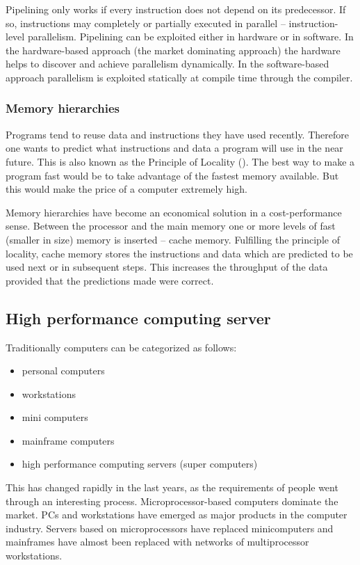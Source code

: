 Pipelining only works if every instruction does not depend on its
predecessor. If so, instructions may completely or partially executed
in parallel -- instruction-level parallelism.
Pipelining can be
exploited either in hardware or in software. In the hardware-based
approach (the market dominating approach) the hardware helps to
discover and achieve parallelism dynamically. In the software-based
approach parallelism is exploited statically at compile time through the
compiler. 

\subsubsection{Memory hierarchies}

Programs tend to reuse data and instructions they have used
recently. Therefore one wants to predict what instructions and data a
program will use in the near future. This is also known as the
Principle of Locality (\cite{C1quant07}). The best way to
make a program fast would be to take advantage of the fastest memory
available. But this would make the price of a computer extremely
high.

Memory hierarchies have become an economical solution in a
cost-performance sense. Between the processor and the main memory one
or more levels of fast (smaller in size) memory is inserted -- cache
memory. Fulfilling the principle of locality, cache memory stores the
instructions and data which are predicted to be used next or in
subsequent steps. This increases the throughput of the data provided that
the predictions made were correct.

\subsection{High performance computing server}

Traditionally computers can be categorized as follows:
\begin{itemize}
\item personal computers
\item workstations
\item mini computers
\item mainframe computers
\item high performance computing servers (super computers)
\end{itemize}

This has changed rapidly in the last years, as the requirements of
people went through an interesting process. Microprocessor-based
computers dominate the market. PCs and workstations have emerged as
major products in the computer industry. Servers based on
microprocessors have replaced minicomputers and mainframes have almost
been replaced with networks of multiprocessor workstations.


